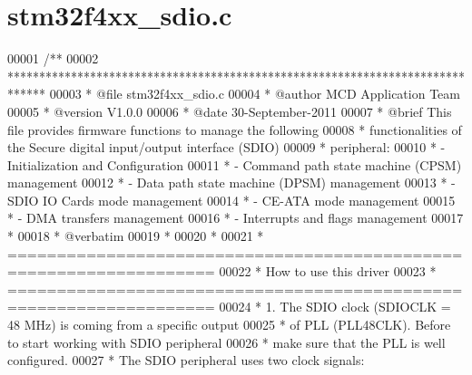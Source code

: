 \section{stm32f4xx\+\_\+sdio.\+c}
\label{stm32f4xx__sdio_8c_source}

\begin{DoxyCode}
00001 \textcolor{comment}{/**}
00002 \textcolor{comment}{  ******************************************************************************}
00003 \textcolor{comment}{  * @file    stm32f4xx\_sdio.c}
00004 \textcolor{comment}{  * @author  MCD Application Team}
00005 \textcolor{comment}{  * @version V1.0.0}
00006 \textcolor{comment}{  * @date    30-September-2011}
00007 \textcolor{comment}{  * @brief   This file provides firmware functions to manage the following }
00008 \textcolor{comment}{  *          functionalities of the Secure digital input/output interface (SDIO) }
00009 \textcolor{comment}{  *          peripheral:}
00010 \textcolor{comment}{  *           - Initialization and Configuration}
00011 \textcolor{comment}{  *           - Command path state machine (CPSM) management}
00012 \textcolor{comment}{  *           - Data path state machine (DPSM) management}
00013 \textcolor{comment}{  *           - SDIO IO Cards mode management}
00014 \textcolor{comment}{  *           - CE-ATA mode management}
00015 \textcolor{comment}{  *           - DMA transfers management}
00016 \textcolor{comment}{  *           - Interrupts and flags management}
00017 \textcolor{comment}{  *}
00018 \textcolor{comment}{  *  @verbatim}
00019 \textcolor{comment}{  *}
00020 \textcolor{comment}{  *}
00021 \textcolor{comment}{  *          ===================================================================}
00022 \textcolor{comment}{  *                                 How to use this driver}
00023 \textcolor{comment}{  *          ===================================================================}
00024 \textcolor{comment}{  *          1. The SDIO clock (SDIOCLK = 48 MHz) is coming from a specific output}
00025 \textcolor{comment}{  *             of PLL (PLL48CLK). Before to start working with SDIO peripheral}
00026 \textcolor{comment}{  *             make sure that the PLL is well configured.}
00027 \textcolor{comment}{  *          The SDIO peripheral uses two clock signals:}

\end{DoxyCode}
